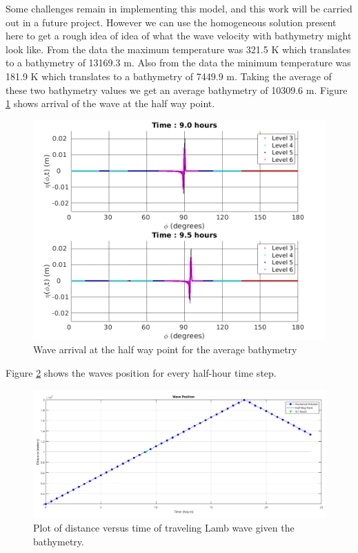 \documentclass[twoside]{bsu-ms}
\begin{document}
 Some challenges remain in implementing this model, and this work will be carried out in a future project. However we can use the homogeneous solution present here to get a rough idea of idea of what the wave velocity with bathymetry might look like. From the data the maximum temperature was 321.5 $\mathrm{K}$ which translates to a bathymetry of 13169.3 $\mathrm{m}$. Also from the data the minimum temperature was 181.9 $\mathrm{K}$ which translates to a bathymetry of 7449.9 $\mathrm{m}$. Taking the average of these two bathymetry values we get an average bathymetry of 10309.6 $\mathrm{m}$. Figure \ref{fig:4.4} shows arrival of the wave at the half way point.
\begin{figure}[!htbp]
    \centering
    \includegraphics[width=\textwidth]{images/avgbath}
    \caption{Wave arrival at the half way point for the average bathymetry}
    \label{fig:4.4}
\end{figure}
Figure \ref{fig:4.5} shows the waves position for every half-hour time step.
\begin{figure}[!htbp]
    \centering
    \includegraphics[width=\textwidth]{images/bathwavepos.png}
    \caption{Plot of distance versus time of traveling Lamb wave given the bathymetry.}
    \label{fig:4.5}
\end{figure}
\end{document}
